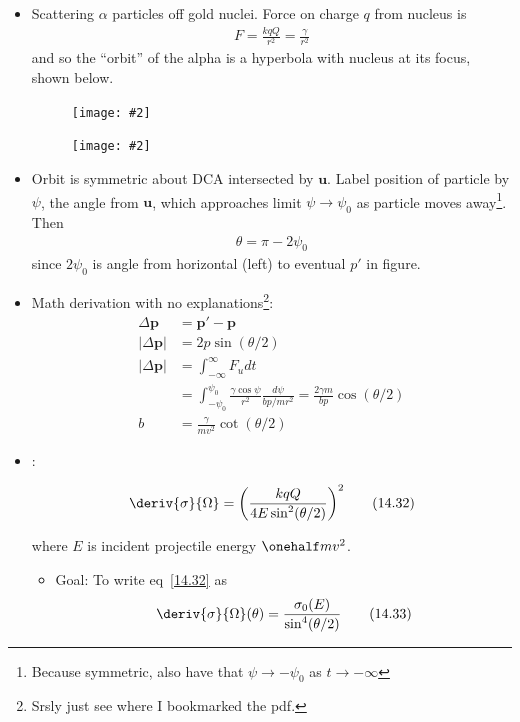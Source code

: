 \documentclass[10pt, twocolumn]{article}
\DeclareRobustCommand{\mybox}[2][gray!20]{%
	\begin{tcolorbox}[   %
		breakable,
		left=0pt,
		right=0pt,
		top=-13pt,
		bottom=0pt,
		colback=#1,
		colframe=#1,
		width=0.45\dimexpr\textwidth\relax,
		enlarge left by=0mm,
		boxsep=1pt,
		arc=0pt,outer arc=0pt,
		]
		#2
	\end{tcolorbox}
}
\newcommand\graybox[1]{ \mybox[gray!20]{\begin{align}#1\end{align}} }
\newcommand\myfig[2][0.3\textwidth]{\begin{figure}[h!]\centering\texttt{[image: \#2]}\end{figure}}
\newcommand\tlab[1]{\tag{#1}\label{#1}}
\begin{document}
\subsection{}
\begin{itemize}
	\item Scattering $\alpha$ particles off gold nuclei. Force on charge $q$ from nucleus is 
	\begin{align}
	F = \frac{kqQ}{r^2} = \frac{\gamma}{r^2} \tlab{14.26}
	\end{align}
	and so the ``orbit'' of the alpha is a hyperbola with nucleus at its focus, shown below. 
	
	\myfig{Rutherford.PNG}
	\myfig{RutherfordTriangle.PNG}
	
	\item Orbit is symmetric about DCA intersected by $\bm{u}$. Label position of particle by $\psi$, the angle from $\bm{u}$, which approaches limit $\psi \rightarrow \psi_0$ as particle moves away\footnote{Because symmetric, also have that $\psi \rightarrow -\psi_0$ as $t \rightarrow -\infty$}. Then
	\begin{align}
	\theta = \pi - 2\psi_0 \tlab{14.27}
	\end{align}
	since $2\psi_0$ is angle from horizontal (left) to eventual $p'$ in figure. 
	
	\item Math derivation with no explanations\footnote{Srsly just see where I bookmarked the pdf.}: 
	\begin{align}
		\Delta\bm{p} &= \bm{p'} - \bm{p} \tlab{14.28} \\
		|\Delta\bm{p}| &= 2p \sin(\theta/2) \tlab{14.29} \\
		|\Delta\bm{p}| &= \int_{-\infty}^{\infty} F_u dt \\
		&= \int_{-\psi_0}^{\psi_0}  \frac{\gamma\cos\psi}{r^2}\frac{d\psi}{bp/mr^2} = \frac{2\gamma m}{bp}\cos(\theta/2) \tlab{14.30} \\
		b &= \frac{\gamma}{mv^2}\cot(\theta/2) \tlab{14.31} 
	\end{align}
	
	\item {}:
	\graybox{\deriv{\sigma}{\Omega} = \bigg( \dfrac{kq Q}{4 E \sin^2(\theta/2) }\bigg)^2 \tlab{14.32}}
	where $E$ is incident projectile energy $\onehalf m v^2$. 
	
	\newpage
	\begin{itemize}
		\item Goal: To write eq~\ref{14.32} as
		\begin{align}
			\deriv{\sigma}{\Omega}(\theta) = \dfrac{\sigma_0(E)}{\sin^4(\theta/2) } \tlab{14.33}
		\end{align}
	\end{itemize}
\end{itemize}
\end{document}
